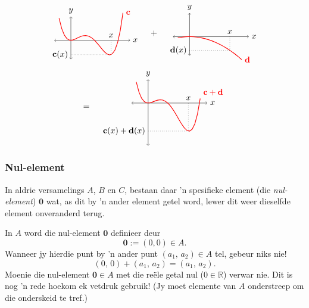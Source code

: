 \documentclass[a4paper,11pt]{book}
\theoremstyle{definition}
\newcommand{\be}{\begin{equation}}
\newcommand{\ee}{\end{equation}}
\newcommand{\ve}[1]{\mathbf{#1}}
\begin{document}
\begin{multline*}
\begin{tikzpicture}[baseline={([yshift=-.5ex]current bounding box.center)},vertex/.style={anchor=base,
	circle,fill=black!25,minimum size=18pt,inner sep=2pt},domain=-0.5:2.2]
\draw[<->] (-0.7, 0) -- (2.5,0) node[right] {$x$};
\draw[<->] (0, -0.8) -- (0, 1) node[above] {$y$};    
\draw[color=red, thick] plot[id=p] (\x, {(\x-2)*\x*\x*(\x-1)})
node[right] {$\ve{c}$};
\draw[dotted]  (1.7, 0)  node[above] {$x$} -- (1.7, -0.6069);
\draw[dotted]  (0, -0.6069)  node[left] {$\ve{c}(x)$} -- (1.7, -0.6069);
\end{tikzpicture}
\quad + \quad
\begin{tikzpicture}[baseline={([yshift=-.5ex]current bounding box.center)},vertex/.style={anchor=base,
	circle,fill=black!25,minimum size=18pt,inner sep=2pt},domain=-0.5:2.2]
\draw[<->] (-0.7, 0) -- (2.5,0) node[right] {$x$};
\draw[<->] (0, -0.8) -- (0, 1) node[above] {$y$};    
\draw[color=red, thick] plot[id=p] (\x ,{-0.2*\x*\x})
node[right] {$\ve{d}$};
\draw[dotted]  (1.7, 0)  node[above] {$x$} -- (1.7, -0.578);
\draw[dotted]  (0, -0.578)  node[left] {$\ve{d}(x)$} -- (1.7, -0.578);
\end{tikzpicture} \\ = \quad
\begin{tikzpicture}[baseline={([yshift=-.5ex]current bounding box.center)},vertex/.style={anchor=base,
	circle,fill=black!25,minimum size=18pt,inner sep=2pt},domain=-0.5:2.2]
\draw[<->] (-0.7, 0) -- (2.5,0) node[right] {$x$};
\draw[<->] (0, -1.8) -- (0, 1) node[above] {$y$};    
\draw[color=red, thick] plot[id=p] (\x,{(\x-2)*\x*\x*(\x-1) - 0.2*\x* \x})
node[above right] {$\ve{c}+\ve{d}$};
\draw[dotted]  (1.7, 0)  node[above] {$x$} -- (1.7, -1.1849);
\draw[dotted]  (0, -1.1849)  node[left] {$\ve{c}(x) + \ve{d}(x)$} -- (1.7, -1.1849);       
\end{tikzpicture}
\end{multline*}

\subsubsection{Nul-element}
In aldrie versamelings $A$, $B$ en $C$, bestaan daar 'n spesifieke element
(die \emph{nul-element}) $\ve{0}$ wat, as dit by 'n ander element getel
word, lewer dit weer dieselfde element onveranderd terug.

In $A$ word die nul-element $\ve{0}$ definieer deur
\be \label{zero_in_A}
\ve{0} := (0,0) \in A.
\ee
Wanneer jy hierdie punt by 'n ander punt $(a_1, \, a_2) \in A$ tel, gebeur
niks nie!
\[
(0, \,0) + (a_1, \, a_2) = (a_1, \, a_2).
\]
Moenie die nul-element  $\ve{0} \in A$ met die re{\"e}le getal nul ($0 \in
\mathbb{R}$) verwar nie. Dit is nog 'n rede hoekom ek vetdruk gebruik! (Jy
moet elemente van $A$ onderstreep om die onderskeid te tref.)
\end{document}
